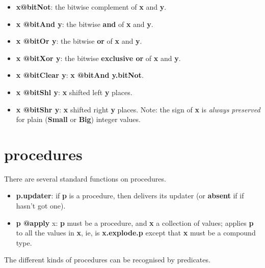\documentclass{report}
\begin{document}
\begin{itemize}\item {\bf x@bitNot}: the bitwise complement of {\bf x} and {\bf y}.

\item {\bf x @bitAnd y}: the bitwise {\bf and} of {\bf x} and {\bf y}.

\item {\bf x @bitOr y}: the bitwise {\bf or} of {\bf x} and {\bf y}.

\item {\bf x @bitXor y}: the bitwise {\bf exclusive or} of {\bf x} and {\bf y}.

\item {\bf x @bitClear y}: {\bf x @bitAnd y.bitNot}.

\item {\bf x @bitShl y}: {\bf x} shifted left {\bf y} places.

\item {\bf x @bitShr y}: {\bf x} shifted right {\bf y} places. Note: the sign of {\bf x} is {\em always
preserved} for plain ({\bf Small} or {\bf Big}) integer values.

\end{itemize}

\section{procedures}


There are several standard functions on procedures.

\begin{itemize}\item {\bf p.updater}: if {\bf p} is a procedure, then delivers its updater (or {\bf absent} if
if hasn't got one).

\item {\bf p @apply }x: {\bf p} must be a procedure, and {\bf x} a collection of values; applies
{\bf p} to all the values in {\bf x}, ie, is {\bf x.explode.p} except that {\bf x} must be a
compound type.

\end{itemize}

The different kinds of procedures can be recognised by predicates.
\end{document}

